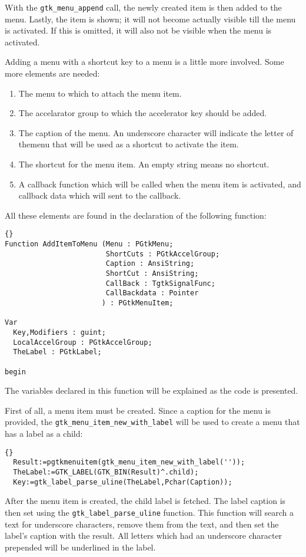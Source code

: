 \documentclass[10pt]{article}
\begin{document}
With the \lstinline|gtk_menu_append| call, the newly created item is then 
added to the menu. Lastly, the item is shown; it will not become actually
visible till the menu is activated. If this is omitted, it will also not
be visible when the menu is activated.

Adding a menu with a shortcut key to a menu is a little more involved. Some
more elements are needed:
\begin{enumerate}
\item The menu to which to attach the menu item.
\item The accelarator group to which the accelerator key should be added.
\item The caption of the menu. An underscore character will indicate the 
letter of themenu that will be used as a shortcut to activate the item.
\item The shortcut for the menu item. An empty string means no shortcut.
\item A callback function which will be called when the menu item is
activated, and callback data which will sent to the callback.
\end{enumerate}
All these elements are found in the declaration of the following function:
\begin{lstlisting}{}
Function AddItemToMenu (Menu : PGtkMenu;
                        ShortCuts : PGtkAccelGroup;
                        Caption : AnsiString;
                        ShortCut : AnsiString;
                        CallBack : TgtkSignalFunc;
                        CallBackdata : Pointer
                       ) : PGtkMenuItem; 

Var
  Key,Modifiers : guint;
  LocalAccelGroup : PGtkAccelGroup;
  TheLabel : PGtkLabel;
  
begin
\end{lstlisting}
The variables declared in this function will be explained as the code is
presented.

First of all, a menu item must be created. Since a caption for the menu is
provided, the \lstinline|gtk_menu_item_new_with_label| will be used to
create a menu that has a label as a child:
\begin{lstlisting}{}
  Result:=pgtkmenuitem(gtk_menu_item_new_with_label(''));
  TheLabel:=GTK_LABEL(GTK_BIN(Result)^.child);
  Key:=gtk_label_parse_uline(TheLabel,Pchar(Caption));
\end{lstlisting}
After the menu item is created, the child label is fetched. The label caption is
then set using the \lstinline|gtk_label_parse_uline| function. This function 
will search a text for underscore characters, remove them from the text, and
then set the label's caption with the result. All letters which had an
underscore character prepended will be underlined in the label.
\end{document}

